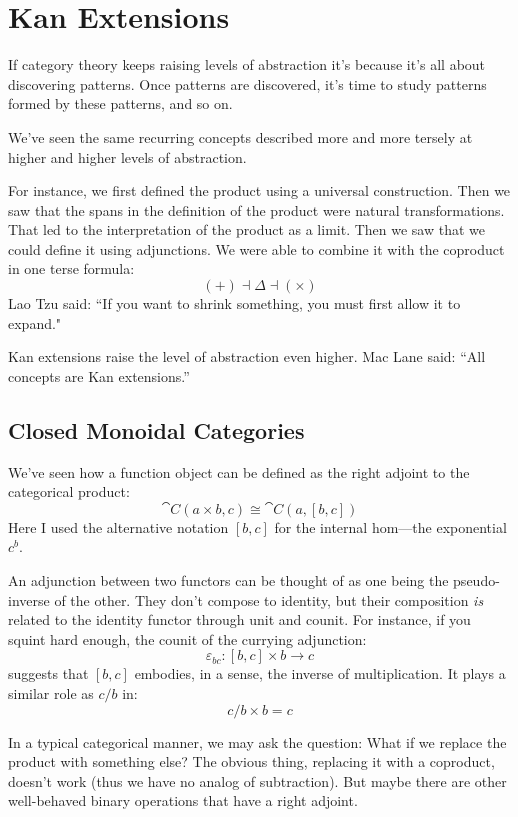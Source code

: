 \documentclass[DaoFP]{subfiles}
\begin{document}
\setcounter{chapter}{20}

\chapter{Kan Extensions}

If category theory keeps raising levels of abstraction it's because it's all about discovering patterns. Once patterns are discovered, it's time to study patterns formed by these patterns, and so on. 

We've seen the same recurring concepts described more and more tersely at higher and higher levels of abstraction. 

For instance, we first defined the product using a universal construction. Then we saw that the spans in the definition of the product were natural transformations. That led to the interpretation of the product as a limit. Then we saw that we could define it using adjunctions. We were able to combine it with the coproduct in one terse formula:
\[ (+) \dashv \Delta \dashv (\times) \]
Lao Tzu said: ``If you want to shrink something, you must first allow it to expand."

Kan extensions raise the level of abstraction even higher. Mac Lane said: ``All concepts are Kan extensions.''

\section{Closed Monoidal Categories}

We've seen how a function object can be defined as the right adjoint to the categorical product:
\[ \cat C (a \times b, c) \cong \cat C (a, [b, c]) \]
Here I used the alternative notation $[b, c]$ for the internal hom---the exponential $c^b$. 

An adjunction between two functors can be thought of as one being the pseudo-inverse of the other. They don't compose to identity, but their composition \emph{is} related to the identity functor through unit and counit. For instance, if you squint hard enough, the counit of the currying adjunction:
\[ \varepsilon_{b c} \colon [b, c] \times b \to c \]
suggests that $[b, c]$ embodies, in a sense, the inverse of multiplication. It plays a similar role as $c/b$ in:
\[ c/b \times b = c \]

In a typical categorical manner, we may ask the question: What if we replace the product with something else? The obvious thing, replacing it with a coproduct, doesn't work (thus we have no analog of subtraction). But maybe there are other well-behaved binary operations that have a right adjoint.
\end{document}

